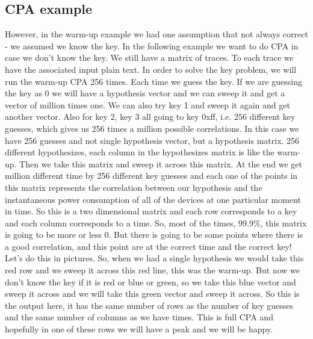 \subsection{CPA example}\label{c8_CPA_example:subsec}
However, in the warm-up example we had one assumption that not always correct - we assumed we know the key. In the following example we want to do CPA in case we don't know the key. We still have a matrix of traces. To each trace we have the associated input plain text. In order to solve the key problem, we will run the warm-up CPA 256 times. Each time we guess the key. If we are guessing the key as 0 we will have a hypothesis vector and we can sweep it and get a vector of million times one. We can also try key 1 and sweep it again and get another vector. Also for key 2, key 3 all going to key 0xff, i.e. 256 different key guesses, which gives us 256 times a million possible correlations. In this case we have 256 guesses and not single hypothesis vector, but a hypothesis matrix. 256 different hypothesizes, each column in the hypothesizes matrix is like the warm-up. Then we take this matrix and sweep it across this matrix. At the end we get million different time by 256 different key guesses and each one of the points in this matrix represents the correlation between our hypothesis and the instantaneous power consumption of all of the devices at one particular moment in time. So this is a two dimensional matrix and each row corresponds to a key and each column corresponds to a time. So, most of the times, 99.9\%, this matrix is going to be more or less 0. But there is going to be some points where there is a good correlation, and this point are at the correct time and the correct key!
Let’s do this in pictures. So, when we had a single hypothesis we would take this red row and we sweep it across this red line, this was the warm-up. But now we don’t know the key if it is red or blue or green, so we take this blue vector and sweep it across and we will take this green vector and sweep it across. So this is the output here, it has the same number of rows as the number of key guesses and the same number of columns as we have times. This is full CPA and hopefully in one of these rows we will have a peak and we will be happy. 
